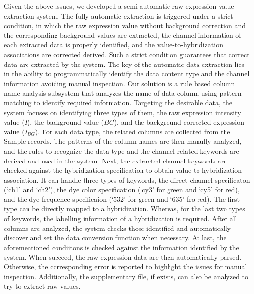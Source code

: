 Given the above issues, we developed a semi-automatic raw expression value
extraction system.
%
The fully automatic extraction is triggered under a strict condition, in which
the raw expression value without background correction and the corresponding
background values are extracted, the channel information of each extracted data
is properly identified, and the value-to-hybridization associations are
corrected derived.
%
Such a strict condition guarantees that correct data are extracted by the
system.
%
The key of the automatic data extraction lies in the ability to
programmatically identify the data content type and the channel information
avoiding manual inspection.
%
Our solution is a rule based column name analysis subsystem that analyzes the 
name
of data column using pattern matching to identify required information.
%
Targeting the desirable data, the system focuses on identifying three types of
them, the raw expression intensity value ($I$), the background value ($BG$),
and the background corrected expression value ($I_{BG}$).
%
For each data type, the related columns are collected from the Sample records.
The patterns of the column names are then manully analyzed, and the rules to
recognize the data type and the channel related keywords are derived and used
in the system.
%
Next, the extracted channel keywords are checked against the hybridization
specification to obtain value-to-hybridization association.
%
It can handle three types of keywords, the direct channel specificaton (`ch1'
and `ch2'), the dye color specification (`cy3' for green and `cy5' for red),
and the dye frequence specificaion (`532' for green and `635' fro red).
%
The first type can be directly mapped to a hybridization.  Whereas, for the
last two types of keywords, the labelling information of a hybridization is
required.
%
After all columns are analyzed, the system checks those identified and
automatically discover and set the data conversion function when necessary.
%
At last, the aforementioned condiitons is checked against the information
identified by the system.
%
When succeed, the raw expression data are then automatically parsed.
Otherwise, the corresponding error is reported to highlight the issues for
manual inspection.
%
%
Additionally, the supplementary file, if exists, can also be analyzed to
try to extract raw values.







